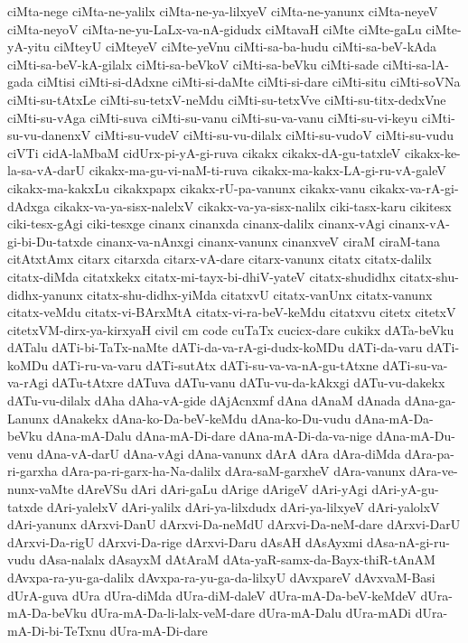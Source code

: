 {ciMta-nege
ciMta-ne-yalilx
ciMta-ne-ya-lilxyeV
ciMta-ne-yanunx
ciMta-neyeV
ciMta-neyoV
ciMta-ne-yu-LaLx-va-nA-gidudx
ciMtavaH
ciMte
ciMte-gaLu
ciMte-yA-yitu
ciMteyU
ciMteyeV
ciMte-yeVnu
ciMti-sa-ba-hudu
ciMti-sa-beV-kAda
ciMti-sa-beV-kA-gilalx
ciMti-sa-beVkoV
ciMti-sa-beVku
ciMti-sade
ciMti-sa-lA-gada
ciMtisi
ciMti-si-dAdxne
ciMti-si-daMte
ciMti-si-dare
ciMti-situ
ciMti-soVNa
ciMti-su-tAtxLe
ciMti-su-tetxV-neMdu
ciMti-su-tetxVve
ciMti-su-titx-dedxVne
ciMti-su-vAga
ciMti-suva
ciMti-su-vanu
ciMti-su-va-vanu
ciMti-su-vi-keyu
ciMti-su-vu-danenxV
ciMti-su-vudeV
ciMti-su-vu-dilalx
ciMti-su-vudoV
ciMti-su-vudu
ciVTi
cidA-laMbaM
cidUrx-pi-yA-gi-ruva
cikakx
cikakx-dA-gu-tatxleV
cikakx-ke-la-sa-vA-darU
cikakx-ma-gu-vi-naM-ti-ruva
cikakx-ma-kakx-LA-gi-ru-vA-galeV
cikakx-ma-kakxLu
cikakxpapx
cikakx-rU-pa-vanunx
cikakx-vanu
cikakx-va-rA-gi-dAdxga
cikakx-va-ya-sisx-nalelxV
cikakx-va-ya-sisx-nalilx
ciki-tasx-karu
cikitesx
ciki-tesx-gAgi
ciki-tesxge
cinanx
cinanxda
cinanx-dalilx
cinanx-vAgi
cinanx-vA-gi-bi-Du-tatxde
cinanx-va-nAnxgi
cinanx-vanunx
cinanxveV
ciraM
ciraM-tana
citAtxtAmx
citarx
citarxda
citarx-vA-dare
citarx-vanunx
citatx
citatx-dalilx
citatx-diMda
citatxkekx
citatx-mi-tayx-bi-dhiV-yateV
citatx-shudidhx
citatx-shu-didhx-yanunx
citatx-shu-didhx-yiMda
citatxvU
citatx-vanUnx
citatx-vanunx
citatx-veMdu
citatx-vi-BArxMtA
citatx-vi-ra-beV-keMdu
citatxvu
citetx
citetxV
citetxVM-dirx-ya-kirxyaH
civil
cm
code
cuTaTx
cucicx-dare
cukikx
dATa-beVku
dATalu
dATi-bi-TaTx-naMte
dATi-da-va-rA-gi-dudx-koMDu
dATi-da-varu
dATi-koMDu
dATi-ru-va-varu
dATi-sutAtx
dATi-su-va-va-nA-gu-tAtxne
dATi-su-va-va-rAgi
dATu-tAtxre
dATuva
dATu-vanu
dATu-vu-da-kAkxgi
dATu-vu-dakekx
dATu-vu-dilalx
dAha
dAha-vA-gide
dAjAcnxmf
dAna
dAnaM
dAnada
dAna-ga-Lanunx
dAnakekx
dAna-ko-Da-beV-keMdu
dAna-ko-Du-vudu
dAna-mA-Da-beVku
dAna-mA-Dalu
dAna-mA-Di-dare
dAna-mA-Di-da-va-nige
dAna-mA-Du-venu
dAna-vA-darU
dAna-vAgi
dAna-vanunx
dArA
dAra
dAra-diMda
dAra-pa-ri-garxha
dAra-pa-ri-garx-ha-Na-dalilx
dAra-saM-garxheV
dAra-vanunx
dAra-ve-nunx-vaMte
dAreVSu
dAri
dAri-gaLu
dArige
dArigeV
dAri-yAgi
dAri-yA-gu-tatxde
dAri-yalelxV
dAri-yalilx
dAri-ya-lilxdudx
dAri-ya-lilxyeV
dAri-yalolxV
dAri-yanunx
dArxvi-DanU
dArxvi-Da-neMdU
dArxvi-Da-neM-dare
dArxvi-DarU
dArxvi-Da-rigU
dArxvi-Da-rige
dArxvi-Daru
dAsAH
dAsAyxmi
dAsa-nA-gi-ru-vudu
dAsa-nalalx
dAsayxM
dAtAraM
dAta-yaR-samx-da-Bayx-thiR-tAnAM
dAvxpa-ra-yu-ga-dalilx
dAvxpa-ra-yu-ga-da-lilxyU
dAvxpareV
dAvxvaM-Basi
dUrA-guva
dUra
dUra-diMda
dUra-diM-daleV
dUra-mA-Da-beV-keMdeV
dUra-mA-Da-beVku
dUra-mA-Da-li-lalx-veM-dare
dUra-mA-Dalu
dUra-mADi
dUra-mA-Di-bi-TeTxnu
dUra-mA-Di-dare
}
